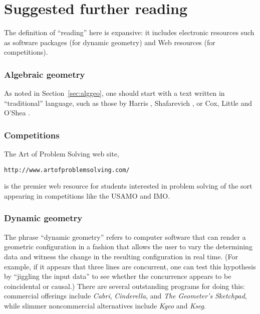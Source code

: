 \documentclass[12pt]{book}
\numberwithin{exc}{section}
\numberwithin{figure}{section}
\numberwithin{equation}{theorem}
\def\fixme#1{\textbf{FIXME! (#1)}}
\begin{document}
\setcounter{secnumdepth}{-1}
\chapter{Suggested further reading}

The definition of ``reading'' here is expansive: it includes electronic
resources such as software packages (for dynamic geometry) and
Web resources (for competitions).

\subsection*{Algebraic geometry}

As noted in Section~\ref{sec:alggeo}, one should start
with a text written in ``traditional'' language, such as those by
Harris \cite{bib:har}, Shafarevich \cite{bib:sha}, or Cox, Little
and O'Shea \cite{bib:clo}.

\subsection*{Competitions}
The Art of Problem Solving web site,
\begin{center}
\texttt{http://www.artofproblemsolving.com/}
\end{center}
is the premier web resource for
students interested in problem solving of the sort appearing in competitions
like the USAMO and IMO.


\subsection*{Dynamic geometry}
The phrase ``dynamic geometry'' refers to computer software that can
render a geometric configuration in a fashion that allows the user to
vary the determining data and witness the change in the resulting 
configuration in real time. (For example, if it appears that three lines
are concurrent, one can test this hypothesis by ``jiggling the input
data'' to see whether the concurrence appears to be coincidental or 
causal.)
There are several outstanding programs for doing this: commercial offerings
include \emph{Cabri}, \emph{Cinderella}, and \emph{The Geometer's Sketchpad},
while slimmer noncommercial alternatives include \textit{Kgeo} and
\textit{Kseg}.
\end{document}
